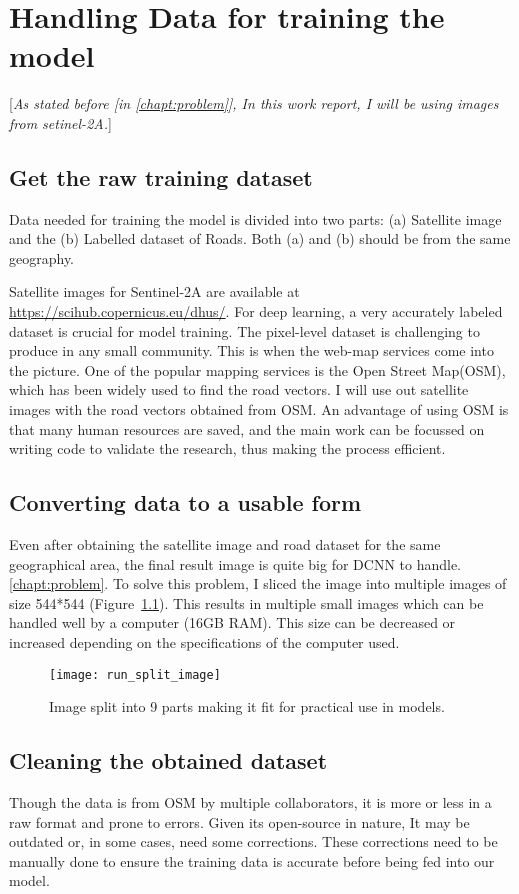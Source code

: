 \chapter{Handling Data for training the model}\label{chapt:data}
[\textit{As stated before [in \ref{chapt:problem}], In this work report, I will be using images from setinel-2A.}]

\section{Get the raw training dataset}
Data needed for training the model is divided into two parts: (a) Satellite image and the (b) Labelled dataset of Roads. Both (a) and (b) should be from the same geography.

Satellite images for Sentinel-2A are available at \url{https://scihub.copernicus.eu/dhus/}. For deep learning, a very accurately labeled dataset is crucial for model training. The pixel-level dataset is challenging to produce in any small community. This is when the web-map services come into the picture. One of the popular mapping services is the Open Street Map(OSM), which has been widely used to find the road vectors. I will use out satellite images with the road vectors obtained from OSM. An advantage of using OSM is that many human resources are saved, and the main work can be focussed on writing code to validate the research, thus making the process efficient.


\section{Converting data to a usable form}
Even after obtaining the satellite image and road dataset for the same geographical area, the final result image is quite big for DCNN to handle. \ref{chapt:problem}. To solve this problem, I sliced the image into multiple images of size 544*544 (Figure~\ref{fig:run_split_images}). This results in multiple small images which can be handled well by a computer (16GB RAM). This size can be decreased or increased depending on the specifications of the computer used.
\begin{figure}[h!]
  \centering
  \texttt{[image: run\_split\_image]}
  \caption{Image split into 9 parts making it fit for practical use in models.}
  \label{fig:run_split_images}
\end{figure}


\section{Cleaning the obtained dataset}
Though the data is from OSM by multiple collaborators, it is more or less in a raw format and prone to errors. Given its open-source in nature, It may be outdated or, in some cases, need some corrections. These corrections need to be manually done to ensure the training data is accurate before being fed into our model.

